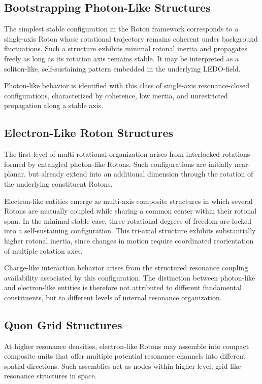 \documentclass[11pt,a4paper]{article}
\begin{document}
\subsection{Bootstrapping Photon-Like Structures}

The simplest stable configuration in the Roton framework corresponds to a single-axis
Roton whose rotational trajectory remains coherent under background fluctuations. Such a
structure exhibits minimal rotonal inertia and propagates freely as long as its rotation
axis remains stable. It may be interpreted as a soliton-like, self-sustaining pattern 
embedded in the underlying LEDO-field.

Photon-like behavior is identified with this class of single-axis resonance-closed
configurations, characterized by coherence, low inertia, and unrestricted propagation
along a stable axis.

\subsection{Electron-Like Roton Structures}

The first level of multi-rotational organization arises from interlocked rotations formed
by entangled photon-like Rotons. Such configurations are initially near-planar, but already
extend into an additional dimension through the rotation of the underlying constituent
Rotons.

Electron-like entities emerge as multi-axis composite structures in which several Rotons are
mutually coupled while sharing a common center within their rotonal span. In the minimal
stable case, three rotational degrees of freedom are locked into a self-sustaining
configuration. This tri-axial structure exhibits substantially higher rotonal inertia,
since changes in motion require coordinated reorientation of multiple rotation axes.

Charge-like interaction behavior arises from the structured resonance coupling
availability associated by this configuration. The distinction between photon-like and
electron-like entities is therefore not attributed to different fundamental constituents,
but to different levels of internal resonance organization.

\subsection{Quon Grid Structures}

At higher resonance densities, electron-like Rotons may assemble into compact composite
units that offer multiple potential resonance channels into different spatial directions.
Such assemblies act as nodes within higher-level, grid-like resonance structures in space.
\end{document}
